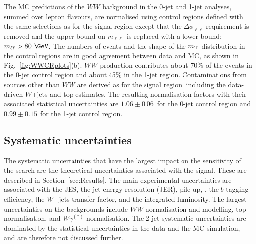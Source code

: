 \documentclass[final,3p,times,twocolumn]{elsarticle}
\newcommand{\ZeroJet}{\mbox{0-jet}}
\newcommand{\OneJet}{\mbox{1-jet}}
\newcommand{\TwoJet}{\mbox{2-jet}}
\newcommand{\hwwmll}{\ensuremath{m_{\ell\ell}}}
\def\WWSFzerojet{\ensuremath{1.06 \pm 0.06}}
\def\WWSFonejet{\ensuremath{0.99 \pm 0.15}}
\newcommand{\Wjets}{$W$+jets}
\begin{document}
The MC predictions of the $WW$ background in the \ZeroJet{} and \OneJet{} analyses,
summed over lepton flavours, are normalised using control regions defined with
the same selections as for the signal region except that the
$\Delta\phi_{\ell\ell}$ requirement is removed and the upper
bound on \hwwmll\ is replaced with a lower bound: $\hwwmll > 80~\GeV$.
The numbers of events and the shape of the $m_{\rm T}$ distribution in the control regions 
are in good agreement between data and MC, as shown in Fig.~\ref{fig:WWCRplots}(b).
$WW$ production contributes  about 70\% of the  
events in the 0-jet control region and about 45\% in the 1-jet region.
Contaminations from sources other than $WW$ are derived as for the signal
region, including the data-driven \Wjets{} and top estimates.
The resulting normalisation factors with their associated statistical uncertainties 
are \WWSFzerojet\ for the \ZeroJet{} control region and 
\WWSFonejet\ for the \OneJet{} control region. 
 

\subsection{Systematic uncertainties}
\label{sec:systematics}

The systematic uncertainties that have the largest impact on the sensitivity of the search are the 
theoretical uncertainties associated with the signal. These are described 
in Section~\ref{sec:Results}.  The main experimental uncertainties are associated with the JES, 
the jet energy resolution (JER), pile-up, \met{}, 
the $b$-tagging efficiency, the $W$+jets transfer factor, and the integrated luminosity. 
The largest uncertainties on the backgrounds 
include $WW$ normalisation and modelling, top normalisation, 
and $W\gamma^{(\ast)}$ normalisation. The \TwoJet{} systematic uncertainties are dominated by 
the statistical uncertainties in the data and the MC simulation, and are therefore not discussed further. 
\end{document}
